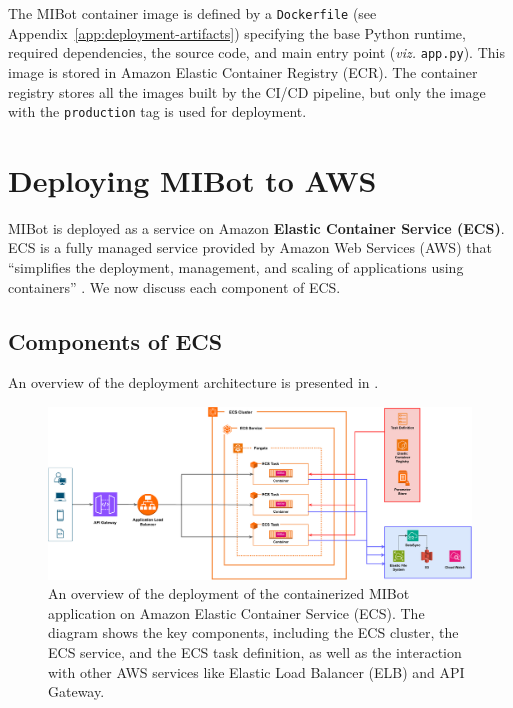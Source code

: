 The MIBot container image is defined by a \texttt{Dockerfile} (see Appendix~\ref{app:deployment-artifacts}) specifying the base Python runtime, required dependencies, the source code, and main entry point (\emph{viz.} \texttt{app.py}). This image is stored in Amazon Elastic Container Registry (ECR). The container registry stores all the images built by the CI/CD pipeline, but only the image with the \texttt{production} tag is used for deployment.

\section{Deploying MIBot to AWS}
\label{sec:mibot-deployment}

MIBot is deployed as a service on Amazon \textbf{Elastic Container Service (ECS)}. ECS is a fully managed service provided by Amazon Web Services (AWS) that ``simplifies the deployment, management, and scaling of applications using containers'' \citep{aws-ecs-getting-started}. We now discuss each component of ECS.

\subsection{Components of ECS}
An overview of the deployment architecture is presented in .
\begin{figure}[ht]
  \centering
  \includegraphics[width=0.99\linewidth]{fig/deployment.drawio.pdf} 
  \caption[MIBot Deployment on AWS ECS]{An overview of the deployment of the containerized MIBot application on Amazon Elastic Container Service (ECS). The diagram shows the key components, including the ECS cluster, the ECS service, and the ECS task definition, as well as the interaction with other AWS services like Elastic Load Balancer (ELB) and API Gateway.}
  \label{fig:ecs-components}
\end{figure}

